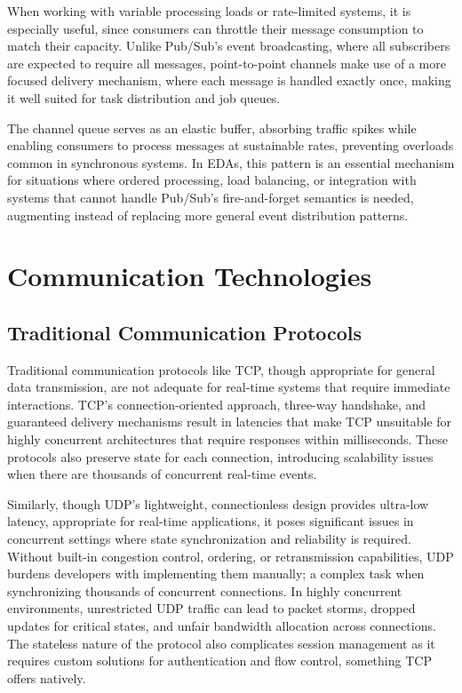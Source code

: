 \documentclass[]{final}
\begin{document}
When working with variable processing loads or rate-limited systems, it is
especially useful, since consumers can throttle their message consumption to
match their capacity. Unlike Pub/Sub's event broadcasting, where all
subscribers are expected to require all messages, point-to-point channels
make use of a more focused delivery mechanism, where each message is
handled exactly once, making it well suited for task distribution and
job queues.

The channel queue serves as an elastic buffer, absorbing traffic spikes while
enabling consumers to process messages at sustainable rates, preventing
overloads common in synchronous systems. In EDAs, this pattern is an
essential mechanism for situations where ordered processing, load balancing,
or integration with systems that cannot handle Pub/Sub's fire-and-forget
semantics is needed, augmenting instead of replacing more general event
distribution patterns.

\newpage

\section{Communication Technologies}

\subsection{Traditional Communication Protocols}

Traditional communication protocols like TCP, though appropriate for general
data transmission, are not adequate for real-time systems that require immediate
interactions. TCP's connection-oriented approach, three-way handshake, and
guaranteed delivery mechanisms result in latencies that make TCP unsuitable
for highly concurrent architectures that require responses within milliseconds.
These protocols also preserve state for each connection, introducing
scalability issues when there are thousands of concurrent real-time events.

Similarly, though UDP's lightweight, connectionless design provides ultra-low
latency, appropriate for real-time applications, it poses significant issues in
concurrent settings where state synchronization and reliability is required.
Without built-in congestion control, ordering, or retransmission capabilities,
UDP burdens developers with implementing them manually; a complex task when
synchronizing thousands of concurrent connections. In highly concurrent
environments, unrestricted UDP traffic can lead to packet storms, dropped
updates for critical states, and unfair bandwidth allocation across
connections. The stateless nature of the protocol also complicates session
management as it requires custom solutions for authentication and flow control,
something TCP offers natively.
\end{document}
